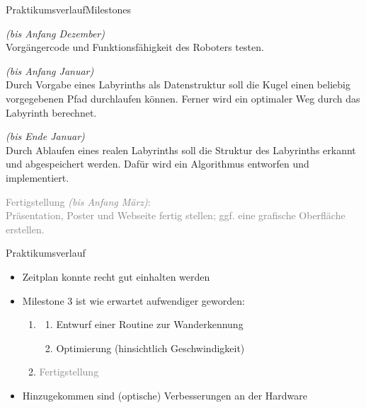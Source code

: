 \documentclass{beamer}
\begin{document}
\begin{frame}[fragile,t]{Praktikumsverlauf}{Milestones}
\begin{enumerate}
 \item {} \textit{(bis Anfang Dezember)}\blue{:}\\
 Vorgängercode und Funktionsfähigkeit des Roboters testen.
 \item {} \textit{(bis Anfang Januar)}\blue{:}\\
 Durch Vorgabe eines Labyrinths als Datenstruktur soll die Kugel einen beliebig vorgegebenen Pfad durchlaufen können. Ferner wird ein optimaler Weg durch das Labyrinth berechnet.
 \item {} \textit{(bis Ende Januar)}\blue{:}\\
 Durch Ablaufen eines realen Labyrinths soll die Struktur des Labyrinths erkannt und abgespeichert werden. Dafür wird ein Algorithmus entworfen und implementiert.
 \textcolor{gray}{
 \item[\textcolor{gray}{4.}] Fertigstellung \textit{(bis Anfang März)}:\\
Präsentation, Poster und Webseite fertig stellen; ggf. eine grafische Oberfläche erstellen.
}
\end{enumerate}
\end{frame}

\begin{frame}[fragile,t]{Praktikumsverlauf}
\begin{itemize}
\item Zeitplan konnte recht gut einhalten werden
\item Milestone 3 ist wie erwartet aufwendiger geworden:

\begin{enumerate}
 \item[3.] 
 \begin{enumerate}
 \item[(a)] Entwurf einer Routine zur Wanderkennung
 \item[(b)] Optimierung (hinsichtlich Geschwindigkeit)
 \end{enumerate}
 \item[\textcolor{gray}{4.}] \textcolor{gray}{Fertigstellung}
\end{enumerate}
\item Hinzugekommen sind (optische) Verbesserungen an der Hardware\\
\end{itemize}
\end{frame}
\end{document}

